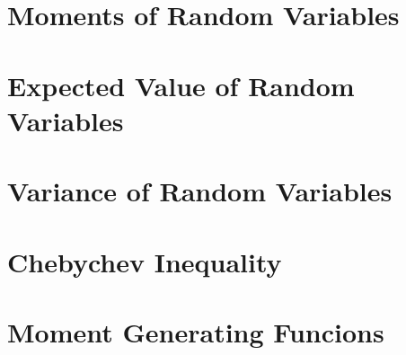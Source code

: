 \section{Moments of Random Variables}

\section{Expected Value of Random Variables}

\section{Variance of Random Variables}

\section{Chebychev Inequality}

\section{Moment Generating Funcions}


